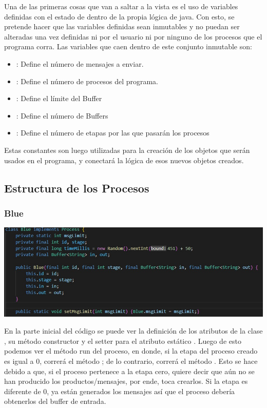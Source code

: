 \documentclass[a4paper]{article}
\begin{document}
    Una de las primeras cosas que van a saltar a la vista es el uso de variables
    definidas con el estado de  dentro de la propia l\'ogica de java.
    Con esto, se pretende hacer que las variables definidas sean inmutables y no puedan ser alteradas una vez definidas ni por el usuario ni por ninguno de los procesos que el programa corra.
    Las variables que caen dentro de este conjunto inmutable son:
    \begin{itemize}
        \item {}: Define el n\'umero de mensajes a enviar.
        \item {}: Define el n\'umero de procesos del programa.
        \item {}: Define el l\'imite del Buffer
        \item {}: Define el n\'umero de Buffers
        \item {}: Define el n\'umero de etapas por las que pasar\'an los procesos
    \end{itemize}

    Estas constantes son luego utilizadas para la creaci\'on de los objetos que ser\'an usados en el programa, y conectar\'a la l\'ogica de esos nuevos objetos creados.

    \subsection{Estructura de los Procesos}

    \subsubsection{Blue}
    \begin{center}
        \includegraphics[scale=0.5]{B1.jpeg}    
    \end{center}
    En la parte inicial del c\'odigo se puede ver la definici\'on de los atributos de la clase , su m\'etodo constructor y el setter para el atributo est\'atico .
    Luego de esto podemos ver el m\'etodo run del proceso, en donde, si la etapa del proceso creado es igual a 0, correr\'a el m\'etodo ; de lo contrario, correr\'a el m\'etodo .
    Esto se hace debido a que, si el proceso pertenece a la etapa cero, quiere decir que a\'un no se han producido los productos/mensajes, por ende, toca crearlos.
    Si la etapa es diferente de 0, ya est\'an generados los mensajes as\'i que el proceso deber\'ia obtenerlos del buffer de entrada.
    
\end{document}
